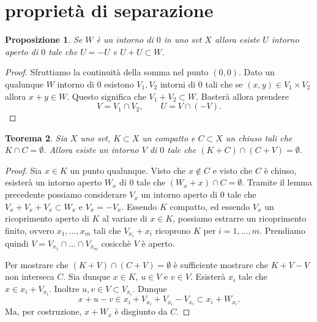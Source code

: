 \documentclass[italian,a4paper,oneside,headinclude]{scrbook}
\newtheorem{theorem}{Teorema}
\newtheorem{proposition}[theorem]{Proposizione}
\begin{document}

\section{propriet\`a di separazione}


\begin{proposition}
  Se $W$ è un intorno di $0$ in uno svt $X$ allora esiste $U$ intorno
  aperto di $0$ tale che $U=-U$ e $U+U\subset W$.
\end{proposition}

\begin{proof}
  Sfruttiamo la continuità della somma nel punto $(0,0)$. Dato un
  qualunque $W$ intorno di $0$ esistono $V_1, V_2$ intorni di $0$ tali
  che se $(x,y)\in V_1\times V_2$ allora $x+y \in W$. Questo significa
  che $V_1+V_2 \subset W$. Basterà allora prendere
  \[
  V=V_1\cap V_2,\qquad U = V \cap (-V).
  \]
\end{proof}

\begin{theorem}
  Sia $X$ uno svt, $K\subset X$ un compatto e $C\subset X$ un chiuso
  tali che $K\cap C=\emptyset$. Allora esiste un intorno $V$ di $0$
  tale che $(K+C) \cap (C+V) = \emptyset$.
\end{theorem}
\begin{proof}
  Sia $x\in K$ un punto qualunque. Visto che $x\not \in C$ e visto che
  $C$ è chiuso, esisterà un intorno aperto $W_x$ di $0$ tale che
  $(W_x + x) \cap C=\emptyset$.
  Tramite il lemma precedente possiamo considerare
  $V_x$ un intorno aperto di $0$ tale che
  $V_x+V_x +V_x \subset W_x$ e
  $V_x=-V_x$.
  Essendo $K$ compatto, ed essendo $V_x$ un
  ricoprimento aperto di $K$ al variare di $x\in K$, possiamo estrarre
  un ricoprimento finito, ovvero $x_1,\dots, x_m$ tali che
  $V_{x_i}+x_i$ ricoprono $K$ per $i=1,\dots, m$. Prendiamo quindi
  $V= V_{x_1} \cap\dots\cap V_{x_m}$ cosicchè
  $V$ è aperto.

  Per mostrare che $(K+V)\cap(C+V)=\emptyset$ è sufficiente mostrare
  che $K+V-V$ non interseca $C$.
  Sia dunque $x\in K$, $u\in V$ e $v\in V$. Esisterà $x_i$ tale che
  $x \in x_i + V_{x_i}$. Inoltre $u,v \in V \subset V_{x_i}$.
  Dunque
  \[
  x+u-v \in x_i + V_{x_i} + V_{x_i} - V_{x_i} \subset x_i +
  W_{x_i}.
  \]
  Ma, per costruzione, $x+W_x$ è disgiunto da $C$.
\end{proof}
\end{document}
